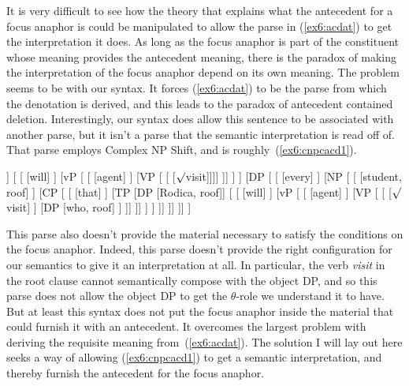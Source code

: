 It is very difficult to see how the theory that explains what the antecedent for a focus anaphor is could be manipulated to allow the parse in (\ref{ex6:acdat}) to get the interpretation it does. As long as the focus anaphor is part of the constituent whose meaning provides the antecedent meaning, there is the paradox of making the interpretation of the focus anaphor depend on its own meaning. The problem seems to be with our syntax. It forces (\ref{ex6:acdat}) to be the parse from which the denotation is derived, and this leads to the paradox of antecedent contained deletion. Interestingly, our syntax does allow this sentence to be associated with another parse, but it isn't a parse that the semantic interpretation is read off of. That parse employs Complex NP Shift, and is roughly~(\ref{ex6:cnpcacd1}).
\begin{exe}
	\raggedright
	\ex \label{ex6:cnpcacd1}
	\footnotesize
\begin{forest}
[TP
	[TP 
		[DP [Thuy, roof]]
		[ 
			[ [will] ]
			[vP [ 
				[ [agent] ]
				[VP [ [ [$\surd$visit]]]]
			]]
		]
	]
	[DP [
		[ [every] ]
		[NP [
			[ [student, roof] ]
			[CP [
				[ [that] ]
				[TP 
					[DP [Rodica, roof]]
					[ 
						[ [will] ]
						[vP [
							[ [agent] ]
							[VP [
								[ [$\surd$visit] ]
								[DP [who, roof] ]
							]]
						]]
					]
				]
			]]
		]]
	]]
]
\end{forest}
\end{exe}
This parse also doesn't provide the material necessary to satisfy the conditions on the focus anaphor. Indeed, this parse doesn't provide the right configuration for our semantics to give it an interpretation at all. In particular, the verb \emph{visit} in the root clause cannot semantically compose with the object DP, and so this parse does not allow the object DP to get the $\theta$-role we understand it to have. But at least this syntax does not put the focus anaphor inside the material that could furnish it with an antecedent. It overcomes the largest problem with deriving the requisite meaning from~(\ref{ex6:acdat}). The solution I will lay out here seeks a way of allowing (\ref{ex6:cnpcacd1}) to get a semantic interpretation, and thereby furnish the antecedent for the focus anaphor.


